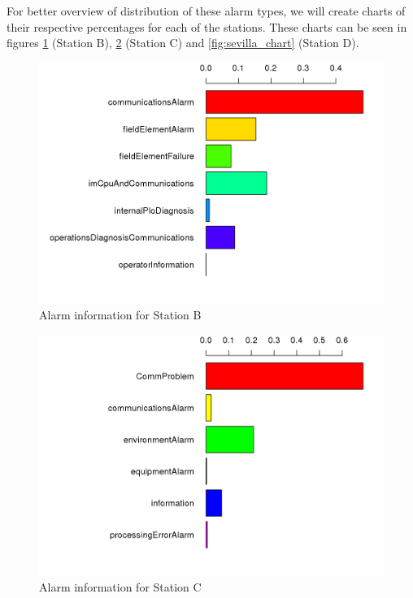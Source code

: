 For better overview of distribution of these alarm types, we will create charts of their respective percentages for each of the stations. These charts can be seen in figures \ref{fig:antequera_chart} (Station B), \ref{fig:segovia_chart} (Station C) and \ref{fig:sevilla_chart} (Station D).

\begin{figure}[htb]
 \centering
 \includegraphics[width=\textwidth]{./img/antequera_graph.png}
 \caption{Alarm information for Station B}
 \label{fig:antequera_chart}
\end{figure}
\begin{figure}[htb]
 \centering
 \includegraphics[width=\textwidth]{./img/segovia_graph.png}
 \caption{Alarm information for Station C}
 \label{fig:segovia_chart}
\end{figure}
